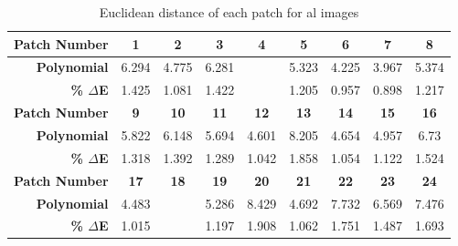 \begin{table}[H]
  \caption{Euclidean distance of each patch for al images }
  \begin{center}
    \begin{tabularx}{\textwidth}{r c c c c c c c c}
    \toprule
        \textbf{Patch Number} & \textbf{1} & \textbf{2} & \textbf{3} & \textbf{4} & \textbf{5} & \textbf{6} & \textbf{7} & \textbf{8}\\ \midrule 
        \textbf{Polynomial} &6.294 &4.775 &6.281 &\cellcolor{colorred}{8.522} &5.323 &4.225 &3.967 &5.374\\ 
        \textbf{\textbf{\% $\Delta$E}} &1.425 &1.081 &1.422 &\cellcolor{colorred}{1.929} &1.205 &0.957 &0.898 &1.217\\ \midrule 
        \textbf{Patch Number} & \textbf{9} & \textbf{10} & \textbf{11} & \textbf{12} & \textbf{13} & \textbf{14} & \textbf{15} & \textbf{16}\\ \midrule 
        \textbf{Polynomial} &5.822 &6.148 &5.694 &4.601 &8.205 &4.654 &4.957 &6.73\\ 
        \textbf{\textbf{\% $\Delta$E}} &1.318 &1.392 &1.289 &1.042 &1.858 &1.054 &1.122 &1.524\\ \midrule 
        \textbf{Patch Number} & \textbf{17} & \textbf{18} & \textbf{19} & \textbf{20} & \textbf{21} & \textbf{22} & \textbf{23} & \textbf{24}\\ \midrule 
        \textbf{Polynomial} &4.483 &\cellcolor{colorgreen}{3.894} &5.286 &8.429 &4.692 &7.732 &6.569 &7.476\\ 
        \textbf{\textbf{\% $\Delta$E}} &1.015 &\cellcolor{colorgreen}{0.882} &1.197 &1.908 &1.062 &1.751 &1.487 &1.693\\ \midrule 
    \bottomrule
    \end{tabularx}
  \end{center}
\end{table}
